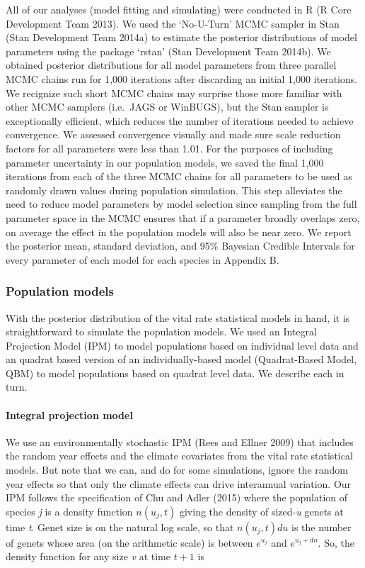 \documentclass[12pt,]{article}
\begin{document}
All of our analyses (model fitting and simulating) were conducted in R
(R Core Development Team 2013). We used the `No-U-Turn' MCMC sampler in
Stan (Stan Development Team 2014a) to estimate the posterior
distributions of model parameters using the package `rstan' (Stan
Development Team 2014b). We obtained posterior distributions for all
model parameters from three parallel MCMC chains run for 1,000
iterations after discarding an initial 1,000 iterations. We recignize
such short MCMC chains may surprise those more familiar with other MCMC
samplers (i.e.~JAGS or WinBUGS), but the Stan sampler is exceptionally
efficient, which reduces the number of iterations needed to achieve
convergence. We assessed convergence visually and made sure scale
reduction factors for all parameters were less than 1.01. For the
purposes of including parameter uncertainty in our population models, we
saved the final 1,000 iterations from each of the three MCMC chains for
all parameters to be used as randomly drawn values during population
simulation. This step alleviates the need to reduce model parameters by
model selection since sampling from the full parameter space in the MCMC
ensures that if a parameter broadly overlaps zero, on average the effect
in the population models will also be near zero. We report the posterior
mean, standard deviation, and 95\% Bayesian Credible Intervals for every
parameter of each model for each species in Appendix B.

\subsubsection{Population models}\label{population-models}

With the posterior distribution of the vital rate statistical models in
hand, it is straightforward to simulate the population models. We used
an Integral Projection Model (IPM) to model populations based on
individual level data and an quadrat based version of an
individually-based model (Quadrat-Based Model, QBM) to model populations
based on quadrat level data. We describe each in turn.

\paragraph{Integral projection model}\label{integral-projection-model}

We use an environmentally stochastic IPM (Rees and Ellner 2009) that
includes the random year effects and the climate covariates from the
vital rate statistical models. But note that we can, and do for some
simulations, ignore the random year effects so that only the climate
effects can drive interannual variation. Our IPM follows the
specification of Chu and Adler (2015) where the population of species
\emph{j} is a density function $n(u_{j},t)$ giving the density of
sized-\emph{u} genets at time \emph{t}. Genet size is on the natural log
scale, so that $n(u_{j},t)du$ is the number of genets whose area (on the
arithmetic scale) is between $e^{u_{j}}$ and $e^{u_{j}+du}$. So, the
density function for any size \emph{v} at time $t+1$ is
\end{document}
